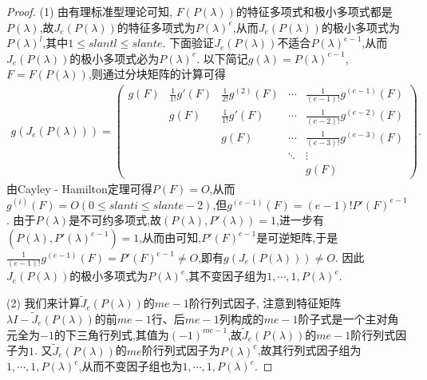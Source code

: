 \documentclass[../../main.tex]{subfiles}
\begin{document}
\begin{proof}
(1) 由有理标准型理论可知, $F(P(\lambda))$的特征多项式和极小多项式都是$P(\lambda)$,故$J_e(P(\lambda))$的特征多项式为$P(\lambda)^e$,从而$J_e(P(\lambda))$的极小多项式为$P(\lambda)^l$,其中$1\leqslant slant l\leqslant slant e$. 下面验证$J_e(P(\lambda))$不适合$P(\lambda)^{e - 1}$,从而$J_e(P(\lambda))$的极小多项式必为$P(\lambda)^e$. 以下简记$g(\lambda)=P(\lambda)^{e - 1}$,$F = F(P(\lambda))$,则通过分块矩阵的计算可得
\begin{align*}
g(J_e(P(\lambda))) = 
\begin{pmatrix}
g(F) & \frac{1}{1!}g'(F) & \frac{1}{2!}g^{(2)}(F) & \cdots & \frac{1}{(e - 1)!}g^{(e - 1)}(F) \\
 & g(F) & \frac{1}{1!}g'(F) & \cdots & \frac{1}{(e - 2)!}g^{(e - 2)}(F) \\
 & & g(F) & \cdots & \frac{1}{(e - 3)!}g^{(e - 3)}(F) \\
 & & & \ddots & \vdots \\
 & & & & g(F)
\end{pmatrix}.
\end{align*}
由Cayley - Hamilton定理可得$P(F)=O$,从而$g^{(i)}(F)=O (0\leqslant slant i\leqslant slant e - 2)$,但$g^{(e - 1)}(F)=(e - 1)!P'(F)^{e - 1}$. 由于$P(\lambda)$是不可约多项式,故$(P(\lambda),P'(\lambda)) = 1$,进一步有$(P(\lambda),P'(\lambda)^{e - 1}) = 1$,从而由可知,$P'(F)^{e - 1}$是可逆矩阵,于是$\frac{1}{(e - 1)!}g^{(e - 1)}(F)=P'(F)^{e - 1}\neq O$,即有$g(J_e(P(\lambda)))\neq O$. 因此$J_e(P(\lambda))$的极小多项式为$P(\lambda)^e$,其不变因子组为$1,\cdots,1,P(\lambda)^e$.

(2) 我们来计算$\widetilde{J}_e(P(\lambda))$的$me - 1$阶行列式因子, 注意到特征矩阵$\lambda I-\widetilde{J}_e(P(\lambda))$的前$me - 1$行、后$me - 1$列构成的$me - 1$阶子式是一个主对角元全为$-1$的下三角行列式,其值为$(-1)^{me - 1}$,故$\widetilde{J}_e(P(\lambda))$的$me - 1$阶行列式因子为$1$. 又$\widetilde{J}_e(P(\lambda))$的$me$阶行列式因子为$P(\lambda)^e$,故其行列式因子组为$1,\cdots,1,P(\lambda)^e$,从而不变因子组也为$1,\cdots,1,P(\lambda)^e$.
\end{proof}
\end{document}
